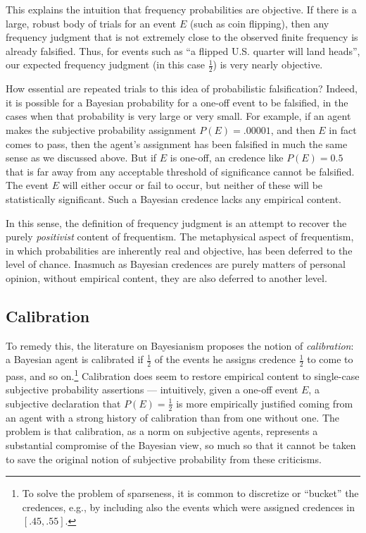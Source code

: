 \documentclass[letterpaper,12pt]{article}
\begin{document}
This explains the intuition that frequency probabilities are objective. If there is a large, robust body of trials for an event $E$ (such as coin flipping), then any frequency judgment that is not extremely close to the observed finite frequency is already falsified. Thus, for events such as ``a flipped U.S. quarter will land heads'', our expected frequency judgment (in this case $\frac{1}{2}$) is very nearly objective.

How essential are repeated trials to this idea of probabilistic falsification? Indeed, it is possible for a Bayesian probability for a one-off event to be falsified, in the cases when that probability is very large or very small. For example, if an agent makes the subjective probability assignment $P(E) = .00001$, and then $E$ in fact comes to pass, then the agent's assignment has been falsified in much the same sense as we discussed above. But if $E$ is one-off, an credence like $P(E) = 0.5$ that is far away from any acceptable threshold of significance cannot be falsified. The event $E$ will either occur or fail to occur, but neither of these will be statistically significant. Such a Bayesian credence lacks any empirical content.

In this sense, the definition of frequency judgment is an attempt to recover the purely \emph{positivist} content of frequentism. The metaphysical aspect of frequentism, in which probabilities are inherently real and objective, has been deferred to the level of chance. Inasmuch as Bayesian credences are purely matters of personal opinion, without empirical content, they are also deferred to another level.

\subsection{Calibration}
\label{sec:calibration}
To remedy this, the literature on Bayesianism proposes the notion of \emph{calibration}: a Bayesian agent is calibrated if $\frac{1}{2}$ of the events he assigns credence $\frac{1}{2}$ to come to pass, and so on.\footnote{To solve the problem of sparseness, it is common to discretize or ``bucket'' the credences, e.g., by including also the events which were assigned credences in $[.45, .55]$.} Calibration does seem to restore empirical content to single-case subjective probability assertions --- intuitively, given a one-off event $E$, a subjective declaration that $P(E) = \frac{1}{2}$ is more empirically justified coming from an agent with a strong history of calibration than from one without one. The problem is that calibration, as a norm on subjective agents, represents a substantial compromise of the Bayesian view, so much so that it cannot be taken to save the original notion of subjective probability from these criticisms.
\end{document}

